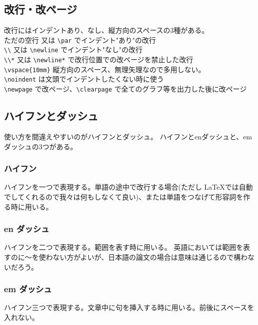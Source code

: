 \documentclass[a4j]{jsarticle}
\begin{document}
\subsection{改行・改ページ}
改行にはインデントあり、なし、縦方向のスペースの3種がある。\\
ただの空行 又は \verb|\par| でインデント"あり"の改行\\
\verb|\\| 又は \verb|\newline| でインデント"なし"の改行\\
\verb|\\*| 又は \verb|\newline*| で改行位置での改ページを禁止した改行\\
\verb|\vspace{10mm}|	縦方向のスペース、無理矢理なので多用しない。\\
\verb|\noindent| は文頭でインデントしたくない時に使う\\
\verb|\newpage| で改ページ、\verb|\clearpage| で全てのグラフ等を出力した後に改ページ
\subsection{ハイフンとダッシュ}
使い方を間違えやすいのがハイフンとダッシュ。
ハイフンとenダッシュと、emダッシュの3つがある。

\subsubsection{ハイフン}
ハイフンを一つで表現する。単語の途中で改行する場合(ただし \LaTeX  では自動でしてくれるので我々は何もしなくて良い)、または単語をつなげて形容詞を作る時に用いる。

\subsubsection{en ダッシュ}
ハイフンを二つで表現する。範囲を表す時に用いる。
英語においては範囲を表すのに～を使わない方がよいが、日本語の論文の場合は意味は通じるので構わないだろう。

\subsubsection{em ダッシュ}
ハイフン三つで表現する。文章中に句を挿入する時に用いる。前後にスペースを入れない。
\end{document}
